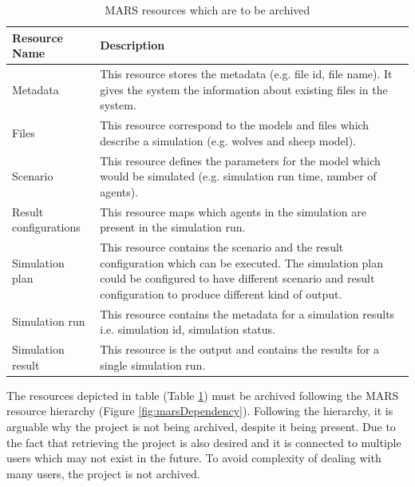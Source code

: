         \begin{table}[h!]
            \centering
            \begin{tabular}{|p{3cm}|p{12cm}|}
                \hline
                    \textbf{Resource Name}  & \textbf{Description}\\
                \hline
                     Metadata & 
                     This resource stores the metadata (e.g. file id, file name). It gives the system the information about
                     existing files in the system. \\
                \hline
                     Files & 
                     This resource correspond to the models and files which describe a simulation (e.g. wolves and sheep model). \\
                \hline
                     Scenario & 
                     This resource defines the parameters for the model which would be simulated (e.g. simulation run time, number of agents). \\
                \hline
                     Result configurations & 
                     This resource maps which agents in the simulation are present in the simulation run.\\
                \hline
                     Simulation plan & 
                     This resource contains the scenario and the result configuration which can be executed. The simulation plan could be configured to
                     have different scenario and result configuration to produce different kind of output.\\
                \hline
                     Simulation run & 
                     This resource contains the metadata for a simulation results i.e. simulation id, simulation status.\\
                \hline
                     Simulation result & 
                     This resource is the output and contains the results for a single simulation run.\\
                \hline
            \end{tabular}
            \caption{MARS resources which are to be archived}
            \label{table: archivedMars}     
        \end{table} 

        The resources depicted in table (Table \ref{table: archivedMars}) must be archived following the MARS resource hierarchy (Figure \ref{fig:marsDependency}).
        Following the hierarchy, it is arguable why the project is not being archived, despite it being present. Due to the fact that retrieving the project is also 
        desired and it is connected to multiple users which may not exist in the future. To avoid complexity of dealing with many users, the project is
        not archived. 
